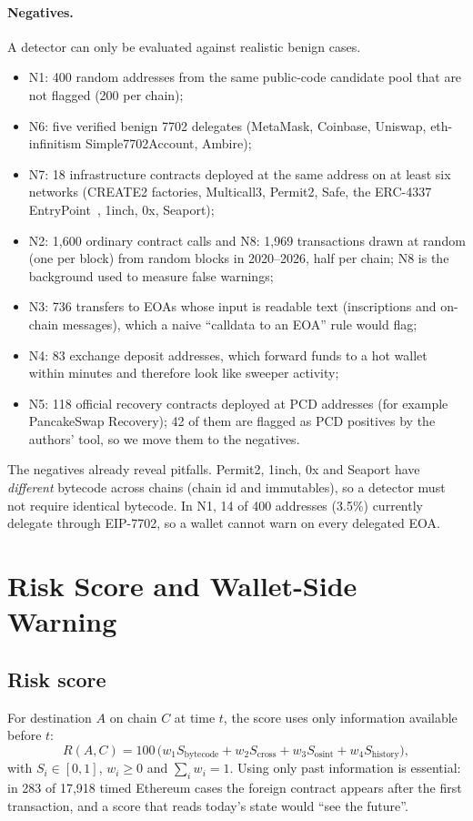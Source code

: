 \documentclass[runningheads]{llncs}
\begin{document}
\paragraph{Negatives.} A detector can only be evaluated against realistic
benign cases.
\begin{itemize}
\item N1: 400 random addresses from the same public-code candidate pool that
are not flagged (200 per chain);
\item N6: five verified benign 7702 delegates (MetaMask, Coinbase, Uniswap,
eth-infinitism Simple7702Account, Ambire);
\item N7: 18 infrastructure contracts deployed at the same address on at least
six networks (CREATE2 factories, Multicall3, Permit2, Safe, the ERC-4337
EntryPoint~\cite{erc4337}, 1inch,
0x, Seaport);
\item N2: 1{,}600 ordinary contract calls and N8: 1{,}969 transactions drawn at
random (one per block) from random blocks in 2020--2026, half per chain; N8 is
the background used to measure false warnings;
\item N3: 736 transfers to EOAs whose input is readable text (inscriptions and
on-chain messages), which a naive ``calldata to an EOA'' rule would flag;
\item N4: 83 exchange deposit addresses, which forward funds to a hot wallet
within minutes and therefore look like sweeper activity;
\item N5: 118 official recovery contracts deployed at PCD addresses (for
example PancakeSwap Recovery); 42 of them are flagged as PCD positives by the
authors' tool, so we move them to the negatives.
\end{itemize}
The negatives already reveal pitfalls. Permit2, 1inch, 0x and Seaport have
\emph{different} bytecode across chains (chain id and immutables), so a
detector must not require identical bytecode. In N1, 14 of 400 addresses (3.5\%)
currently delegate through EIP-7702, so a wallet cannot warn on every delegated
EOA.

\section{Risk Score and Wallet-Side Warning}
\label{sec:design}
\subsection{Risk score}
For destination $A$ on chain $C$ at time $t$, the score uses only information
available before $t$:
\begin{equation}
R(A,C)=100\,\bigl(w_1S_{\mathrm{bytecode}}+w_2S_{\mathrm{cross}}+w_3S_{\mathrm{osint}}+w_4S_{\mathrm{history}}\bigr),
\end{equation}
with $S_i\in[0,1]$, $w_i\ge0$ and $\sum_iw_i=1$. Using only past information is
essential: in 283 of 17{,}918 timed Ethereum cases the foreign contract appears
after the first transaction, and a score that reads today's state would
``see the future''.
\end{document}
